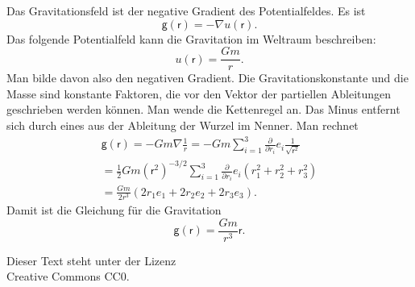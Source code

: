 \documentclass[a4paper,11pt,fleqn,twocolumn,twoside,dvipdfmx]{scrartcl}
\newcommand{\bvec}[1]{\bm{\mathsf{#1}}}
\begin{document}
Das Gravitationsfeld ist der negative Gradient des Potentialfeldes.
Es ist%
\[\bvec g(\bvec r) = -\nabla u(\bvec r).\]
Das folgende Potentialfeld kann die Gravitation im Weltraum
beschreiben:%
\[u(\bvec r) = \frac{Gm}{r}.\]
Man bilde davon also den negativen Gradient. Die Gravitationskonstante
und die Masse sind konstante Faktoren, die vor den Vektor der
partiellen Ableitungen geschrieben werden können. Man wende die
Kettenregel an. Das Minus entfernt sich durch eines aus der
Ableitung der Wurzel im Nenner. Man rechnet%
\begin{gather*}
\bvec g(\bvec r)
= -Gm\nabla\frac{1}{r}
= -Gm\sum_{i=1}^3 \frac{\partial}{\partial r_i}
e_i \frac{1}{\sqrt{\bvec r^2}}\\
= \frac{1}{2}Gm (\bvec r^2)^{-3/2}
\sum_{i=1}^3 \frac{\partial}{\partial r_i} e_i (r_1^2+r_2^2+r_3^2)\\
= \frac{Gm}{2r^3}(2r_1e_1 + 2r_2e_2 + 2r_3e_3).
\end{gather*}
Damit ist die Gleichung für die Gravitation%
\[\bvec g(\bvec r) = \frac{Gm}{r^3} \bvec r.\]


\vfill\noindent
Dieser Text steht unter der Lizenz\\
Creative Commons CC0.
\end{document}
